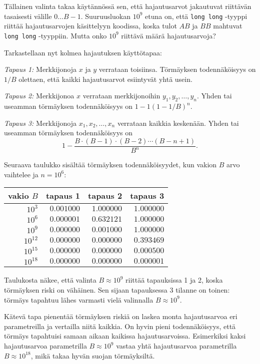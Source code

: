 Tällainen valinta takaa käytännössä sen,
että hajautusarvot jakautuvat riittävän
tasaisesti välille $0 \ldots B-1$.
Suuruusluokan $10^9$ etuna on,
että \texttt{long long} -tyyppi riittää
hajautusarvojen käsittelyyn koodissa,
koska tulot $AB$ ja $BB$ mahtuvat \texttt{long long} -tyyppiin.
Mutta onko $10^9$ riittävä määrä hajautusarvoja?

Tarkastellaan nyt kolmea hajautuksen käyttötapaa:

\textit{Tapaus 1:} Merkkijonoja $x$ ja $y$ verrataan toisiinsa.
Törmäyksen todennäköisyys on $1/B$ olettaen,
että kaikki hajautusarvot esiintyvät yhtä usein.

\textit{Tapaus 2:} Merkkijonoa $x$ verrataan merkkijonoihin
$y_1,y_2,\ldots,y_n$.
Yhden tai useamman törmäyksen todennäköisyys on $1-1(1-1/B)^n$.

\textit{Tapaus 3:} Merkkijonoja $x_1,x_2,\ldots,x_n$
verrataan kaikkia keskenään.
Yhden tai useamman törmäyksen todennäköisyys on
\[ 1 - \frac{B \cdot (B-1) \cdot (B-2) \cdots (B-n+1)}{B^n}.\]

Seuraava taulukko sisältää törmäyksen todennäköisyydet,
kun vakion $B$ arvo vaihtelee ja $n=10^6$:

\begin{center}
\begin{tabular}{rrrr}
vakio $B$ & tapaus 1 & tapaus 2 & tapaus 3 \\
\hline
$10^3$ & $0.001000$ & $1.000000$ & $1.000000$ \\
$10^6$ & $0.000001$ & $0.632121$ & $1.000000$ \\
$10^9$ & $0.000000$ & $0.001000$ & $1.000000$ \\
$10^{12}$ & $0.000000$ & $0.000000$ & $0.393469$ \\
$10^{15}$ & $0.000000$ & $0.000000$ & $0.000500$ \\
$10^{18}$ & $0.000000$ & $0.000000$ & $0.000001$ \\
\end{tabular}
\end{center}

Taulukosta näkee, että valinta $B \approx 10^9$
riittää tapauksissa 1 ja 2,
koska törmäyksen riski on vähäinen.
Sen sijaan tapauksessa 3 tilanne on toinen:
törmäys tapahtuu lähes varmasti
vielä valinnalla $B \approx 10^9$.

Kätevä tapa pienentää törmäyksen riskiä on laskea
monta hajautusarvoa eri parametreilla
ja vertailla niitä kaikkia.
On hyvin pieni todennäköisyys,
että törmäys tapahtuisi samaan aikaan
kaikissa hajautusarvoissa.
Esimerkiksi kaksi hajautusarvoa parametrilla
$B \approx 10^9$ vastaa yhtä hajautusarvoa
parametrilla $B \approx 10^{18}$,
mikä takaa hyvän suojan törmäyksiltä.

